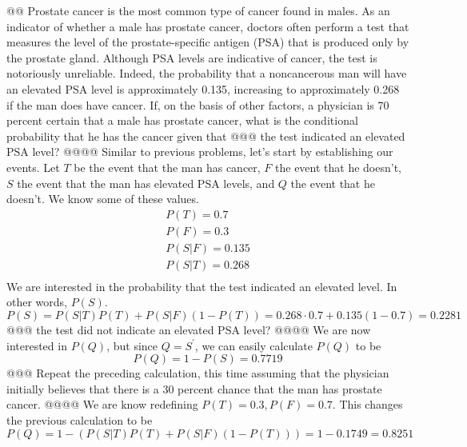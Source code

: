 \documentclass[10pt]{article}
\begin{document}
\begin{easylist}[enumerate]
    @@ Prostate cancer is the most common type of cancer found in males. As an indicator of whether a male has prostate
    cancer, doctors often perform a test that measures the level of the prostate-specific antigen (PSA) that is produced
    only by the prostate gland. Although PSA levels are indicative of cancer, the test is notoriously unreliable.
    Indeed, the probability that a noncancerous man will have an elevated PSA level is approximately 0.135, increasing
    to approximately 0.268 if the man does have cancer. If, on the basis of other factors, a physician is 70 percent
    certain that a male has prostate cancer, what is the conditional probability that he has the cancer given that
    @@@ the test indicated an elevated PSA level?
    @@@@ Similar to previous problems, let's start by establishing our events. Let $T$ be the event that the man has
    cancer, $F$ the event that he doesn't, $S$ the event that the man has elevated PSA levels, and $Q$ the event that he
    doesn't. We know some of these values.
        \[
            \begin{aligned}
                P(T) = 0.7\\
                P(F) = 0.3\\
                P(S|F) = 0.135\\
                P(S|T) = 0.268\\
            \end{aligned}
        \]
    We are interested in the probability that the test indicated an elevated level. In other words, $P(S)$.
        \[ P(S) = P(S|T)P(T) + P(S|F)(1 - P(T)) = 0.268 \cdot 0.7 + 0.135 ( 1 - 0.7) = \boxed{0.2281} \]
    @@@ the test did not indicate an elevated PSA level?
    @@@@ We are now interested in $P(Q)$, but since $Q = S^\prime$, we can easily calculate $P(Q)$ to be
        \[ P(Q) = 1 - P(S) = \boxed{0.7719} \]
    @@@ Repeat the preceding calculation, this time assuming that the physician initially believes that there is a 30
    percent chance that the man has prostate cancer.
    @@@@ We are know redefining $P(T) = 0.3, P(F) = 0.7$. This changes the previous calculation to be
        \[ P(Q) = 1 - \left( P(S|T)P(T) + P(S|F)(1 - P(T)) \right) = 1 - 0.1749 = \boxed{0.8251} \]


\end{easylist}
\end{document}
